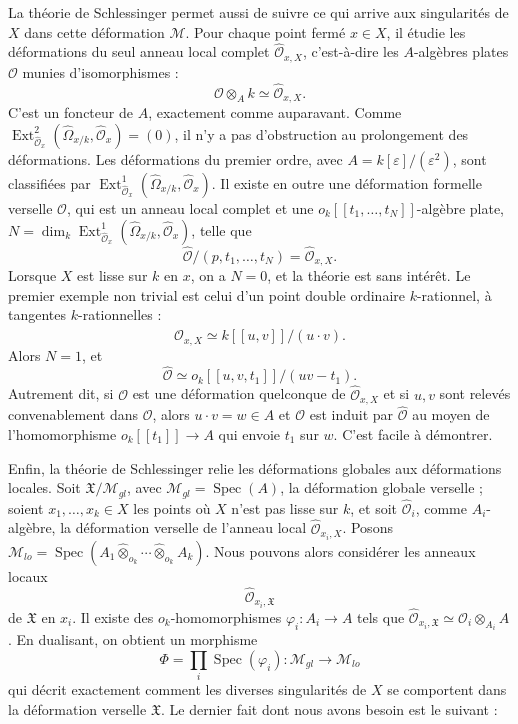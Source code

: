 \documentclass[10pt]{article}
\newcommand{\Spec}{\operatorname{Spec}}
\newcommand{\Ext}{\operatorname{Ext}}
\newcommand{\cO}{\mathcal O}
\newcommand{\cM}{\mathcal M}
\newcommand{\cX}{\mathfrak X}
\newcommand{\eps}{\varepsilon}
\begin{document}
La théorie de Schlessinger permet aussi de suivre ce qui arrive aux singularités de $X$ dans cette déformation $\cM$. Pour chaque point fermé $x\in X$, il étudie les déformations du seul anneau local complet $\widehat{\cO}_{x,X}$, c'est-à-dire les $A$-algèbres plates $\cO$ munies d'isomorphismes :
\[
\cO\otimes_A k\simeq \widehat{\cO}_{x,X}.
\]
C'est un foncteur de $A$, exactement comme auparavant. Comme $\Ext^2_{\widehat{\cO}_x}(\widehat{\Omega}_{x/k},\widehat{\cO}_x)=(0)$, il n'y a pas d'obstruction au prolongement des déformations. Les déformations du premier ordre, avec $A=k[\eps]/(\eps^2)$, sont classifiées par $\Ext^1_{\widehat{\cO}_x}(\widehat{\Omega}_{x/k},\widehat{\cO}_x)$. Il existe en outre une déformation formelle verselle $\widehat{\cO}$, qui est un anneau local complet et une $o_k[[t_1,\ldots,t_N]]$-algèbre plate, $N=\dim_k\Ext^1_{\widehat{\cO}_x}(\widehat{\Omega}_{x/k},\widehat{\cO}_x)$, telle que
\[
\widehat{\cO}/(p,t_1,\ldots,t_N)=\widehat{\cO}_{x,X}.
\]
Lorsque $X$ est lisse sur $k$ en $x$, on a $N=0$, et la théorie est sans intérêt. Le premier exemple non trivial est celui d'un point double ordinaire $k$-rationnel, à tangentes $k$-rationnelles :
\[
\widehat{\cO}_{x,X}\simeq k[[u,v]]/(u\cdot v).
\]
Alors $N=1$, et
\[
\widehat{\cO}\simeq o_k[[u,v,t_1]]/(uv-t_1).
\]
Autrement dit, si $\cO$ est une déformation quelconque de $\widehat{\cO}_{x,X}$ et si $u,v$ sont relevés convenablement dans $\cO$, alors $u\cdot v=w\in A$ et $\cO$ est induit par $\widehat{\cO}$ au moyen de l'homomorphisme $o_k[[t_1]]\to A$ qui envoie $t_1$ sur $w$. C'est facile à démontrer.

Enfin, la théorie de Schlessinger relie les déformations globales aux déformations locales. Soit $\cX/\cM_{gl}$, avec $\cM_{gl}=\Spec(A)$, la déformation globale verselle ; soient $x_1,\ldots,x_k\in X$ les points où $X$ n'est pas lisse sur $k$, et soit $\widehat{\cO}_i$, comme $A_i$-algèbre, la déformation verselle de l'anneau local $\widehat{\cO}_{x_i,X}$. Posons $\cM_{lo}=\Spec(A_1\widehat\otimes_{o_k}\cdots\widehat\otimes_{o_k}A_k)$. Nous pouvons alors considérer les anneaux locaux
\[
\widehat{\cO}_{x_i,\cX}
\]
de $\cX$ en $x_i$. Il existe des $o_k$-homomorphismes $\varphi_i:A_i\to A$ tels que $\widehat{\cO}_{x_i,\cX}\simeq\widehat{\cO}_i\otimes_{A_i}A$. En dualisant, on obtient un morphisme
\[
\Phi=\prod_i \Spec(\varphi_i):\cM_{gl}\to\cM_{lo}
\]
qui décrit exactement comment les diverses singularités de $X$ se comportent dans la déformation verselle $\cX$. Le dernier fait dont nous avons besoin est le suivant :
\end{document}
